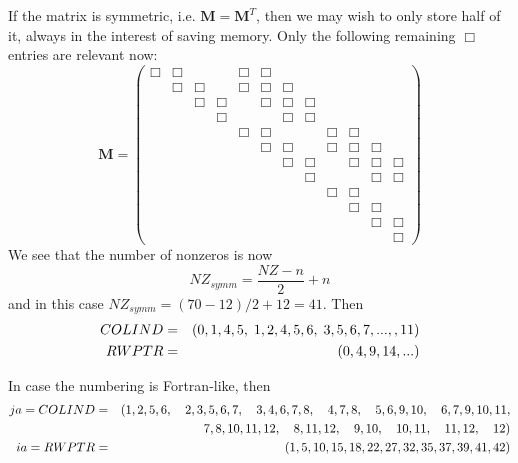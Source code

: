 If the matrix is symmetric, i.e. ${\bm M}={\bm M}^T$, then we may wish to 
only store half of it, always in the interest of saving memory. 
Only the following remaining $\Box$ entries are relevant now:
\[
{\bm M}=
\left(
\begin{array}{cccccccccccc}
\Box & \Box &      &      & \Box & \Box &      &      &      &      &      &      \\
     & \Box & \Box &      & \Box & \Box & \Box &      &      &      &      &      \\
     &      & \Box & \Box &      & \Box & \Box & \Box &      &      &      &      \\
     &      &      & \Box &      &      & \Box & \Box &      &      &      &      \\
     &      &      &      & \Box & \Box &      &      & \Box & \Box &      &      \\
     &      &      &      &      & \Box & \Box &      & \Box & \Box & \Box &      \\
     &      &      &      &      &      & \Box & \Box &      & \Box & \Box & \Box \\
     &      &      &      &      &      &      & \Box &      &      & \Box & \Box \\
     &      &      &      &      &      &      &      & \Box & \Box &      &      \\
     &      &      &      &      &      &      &      &      & \Box & \Box &      \\
     &      &      &      &      &      &      &      &      &      & \Box & \Box \\
     &      &      &      &      &      &      &      &      &      &      & \Box 
\end{array}
\right)
\]
We see that the number of nonzeros is now 
\[
NZ_{symm}= \frac{NZ-n}{2}+n
\]
and in this case $NZ_{symm}=(70-12)/2+12=41$.
Then 
\begin{eqnarray}
COLIND&=&(0,1,4,5, \; 1,2,4,5,6, \; 3,5,6,7, ..., ,11) \nonumber\\
RWPTR &=&(0,4,9,14, ... )   \nonumber
\end{eqnarray}

In case the numbering is Fortran-like, then 
\begin{eqnarray}
ja=COLIND&=&(
1, 2, 5, 6, \quad  2, 3, 5, 6, 7, \quad 3, 4, 6, 7, 8, \quad      
4, 7, 8, \quad  5, 6, 9, 10, \quad 6, 7, 9, 10, 11, \nonumber\\
&& 7, 8, 10, 11, 12, \quad 8, 11, 12, \quad 9, 10, \quad 10, 11, \quad  11, 12, \quad 12) \nonumber\\
ia=RWPTR &=&(1, 5, 10, 15, 18, 22, 27, 32, 35, 37, 39, 41, 42)  \nonumber
\end{eqnarray}

